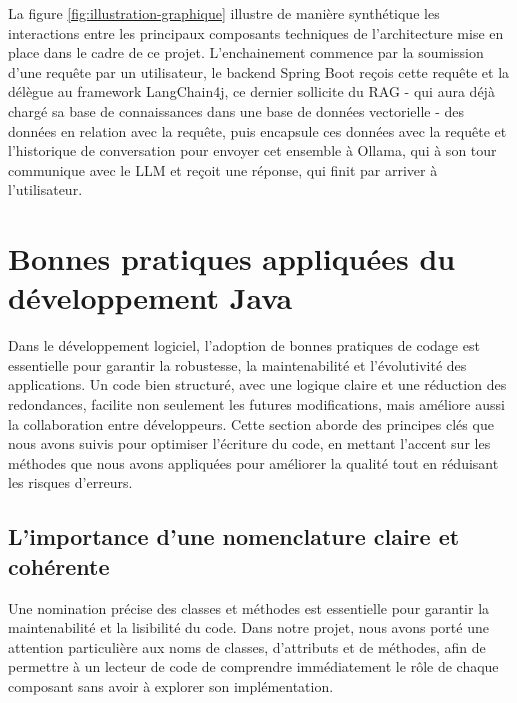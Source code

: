 \documentclass[12pt,a4paper]{report}
\begin{document}
	La figure \ref{fig:illustration-graphique} illustre de manière synthétique les interactions entre les principaux composants techniques de l’architecture mise en place dans le cadre de ce projet. L'enchainement commence par la soumission d'une requête par un utilisateur, le backend Spring Boot reçois cette requête et la délègue au framework LangChain4j, ce dernier sollicite du RAG - qui aura déjà chargé sa base de connaissances dans une base de données vectorielle - des données en relation avec la requête, puis encapsule ces données avec la requête et l'historique de conversation pour envoyer cet ensemble à Ollama, qui à son tour communique avec le LLM et reçoit une réponse, qui finit par arriver à l'utilisateur.
	
	\section{Bonnes pratiques appliquées du développement Java}
	
	Dans le développement logiciel, l'adoption de bonnes pratiques de codage est essentielle pour garantir la robustesse, la maintenabilité et l'évolutivité des applications. Un code bien structuré, avec une logique claire et une réduction des redondances, facilite non seulement les futures modifications, mais améliore aussi la collaboration entre développeurs. Cette section aborde des principes clés que nous avons suivis pour optimiser l'écriture du code, en mettant l'accent sur les méthodes que nous avons appliquées pour améliorer la qualité tout en réduisant les risques d'erreurs.
	
	\subsection{L'importance d'une nomenclature claire et cohérente}
	
	Une nomination précise des classes et méthodes est essentielle pour garantir la maintenabilité et la lisibilité du code. Dans notre projet, nous avons porté une attention particulière aux noms de classes, d'attributs et de méthodes, afin de permettre à un lecteur de code de comprendre immédiatement le rôle de chaque composant sans avoir à explorer son implémentation.
	
\end{document}
